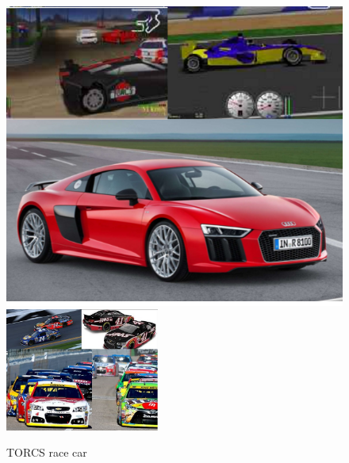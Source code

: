 \documentclass{llncs}
\begin{document}
\begin{figure}[h!]
	\centering
	\label{voiture}
	\includegraphics[width=0.4
	\textwidth]{fig/voiture.png}
	\includegraphics[width=0.45\textwidth]{fig/nascar.PNG}
	\begin{minipage}{10cm}
		\centering
		
		\caption{\footnotesize TORCS race car}
		
	\end{minipage} 
\end{figure}
\end{document}
